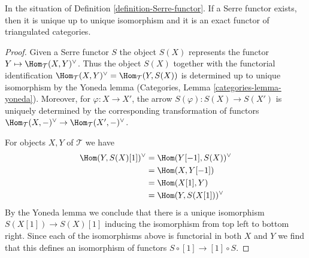 \begin{lemma}
\label{lemma-Serre-functor}
In the situation of Definition \ref{definition-Serre-functor}.
If a Serre functor exists, then it is unique up to unique isomorphism and
it is an exact functor of triangulated categories.
\end{lemma}

\begin{proof}
Given a Serre functor $S$ the object $S(X)$ represents
the functor $Y \mapsto \Hom_\mathcal{T}(X, Y)^\vee$.
Thus the object $S(X)$ together with the functorial identification
$\Hom_\mathcal{T}(X, Y)^\vee = \Hom_\mathcal{T}(Y, S(X))$
is determined up to unique isomorphism by the Yoneda lemma
(Categories, Lemma \ref{categories-lemma-yoneda}).
Moreover, for $\varphi : X \to X'$, the arrow $S(\varphi) : S(X) \to S(X')$
is uniquely determined by the corresponding transformation of functors
$\Hom_\mathcal{T}(X, -)^\vee \to \Hom_\mathcal{T}(X', -)^\vee$.

\medskip\noindent
For objects $X, Y$ of $\mathcal{T}$ we have
\begin{align*}
\Hom(Y, S(X)[1])^\vee
& =
\Hom(Y[-1], S(X))^\vee \\
& =
\Hom(X, Y[-1]) \\
& =
\Hom(X[1], Y) \\
& =
\Hom(Y, S(X[1]))^\vee
\end{align*}
By the Yoneda lemma we conclude that there is a unique isomorphism
$S(X[1]) \to S(X)[1]$ inducing the isomorphism from top left to bottom right.
Since each of the isomorphisms above is functorial in both $X$ and $Y$
we find that this defines an isomorphism of functors
$S \circ [1] \to [1] \circ S$.


\end{proof}
